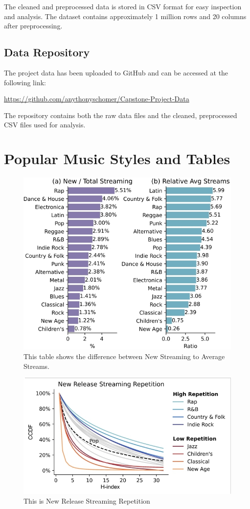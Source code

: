 \documentclass[runningheads]{llncs}
\begin{document}
The cleaned and preprocessed data is stored in CSV format for easy inspection and analysis. The dataset contains approximately 1 million rows and 20 columns after preprocessing.

\subsection{Data Repository}
The project data has been uploaded to GitHub and can be accessed at the following link:

\url{https://github.com/anythonyschomer/Capstone-Project-Data}

The repository contains both the raw data files and the cleaned, preprocessed CSV files used for analysis.

\section{Popular Music Styles and Tables}

\begin{figure}
\includegraphics[width=\textwidth]{streaming 2.jpg}
\caption{This table shows the difference between New Streaming to Average Streams.} 
\label{fig1}
\end{figure}

\begin{figure}
\includegraphics[width=\textwidth]{Streaming 1.jpg}
\caption{This is New Release Streaming Repetition} 
\label{mecFig}
\end{figure}
\end{document}
